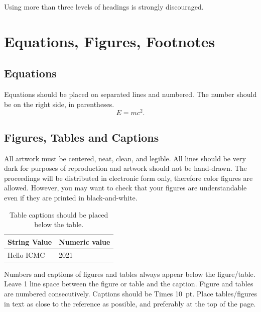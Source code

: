\documentclass{article}
\begin{document}
Using more than three levels of headings is strongly discouraged.

\pagebreak

\section{Equations, Figures, Footnotes}

\subsection{Equations}
Equations should be placed on separated lines and numbered.
The number should be on the right side, in parentheses.
\begin{equation}
E=mc^{2}.
\label{eq:Emc2}
\end{equation}

\subsection{Figures, Tables and Captions}
All artwork must be centered, neat, clean, and legible. All lines should be very dark for purposes of reproduction and artwork should not be hand-drawn. The proceedings will be distributed in electronic form only, therefore color figures are allowed. However, you may want to check that your figures are understandable even if they are printed in black-and-white.
\begin{table}[h]
 \begin{center}
 \begin{tabular}{|l|l|}
  \hline
  String Value & Numeric value \\
  \hline
  Hello ICMC & 2021 \\
  \hline
 \end{tabular}
\end{center}
 \caption{Table captions should be placed below the table.}
 \label{tab:example}
\end{table}

Numbers and captions of figures and tables always appear below the figure/table. Leave 1 line space between the figure or table and the caption. Figure and tables are numbered consecutively. Captions should be Times 10~pt. Place tables/figures in text as close to the reference as possible, and preferably at the top of the page.
\end{document}

